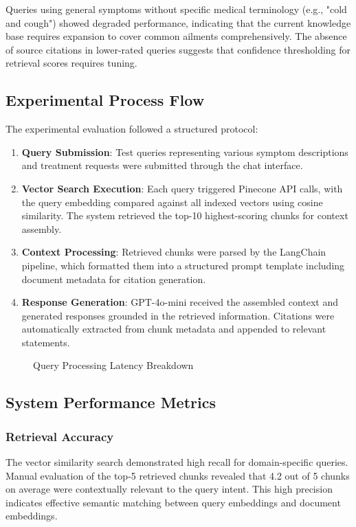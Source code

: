 \documentclass[conference]{IEEEtran}
\begin{document}
Queries using general symptoms without specific medical terminology (e.g., "cold and cough") showed degraded performance, indicating that the current knowledge base requires expansion to cover common ailments comprehensively. The absence of source citations in lower-rated queries suggests that confidence thresholding for retrieval scores requires tuning.

\subsection{Experimental Process Flow}
The experimental evaluation followed a structured protocol:

\begin{enumerate}
    \item \textbf{Query Submission}: Test queries representing various symptom descriptions and treatment requests were submitted through the chat interface.
    \item \textbf{Vector Search Execution}: Each query triggered Pinecone API calls, with the query embedding compared against all indexed vectors using cosine similarity. The system retrieved the top-10 highest-scoring chunks for context assembly.
    \item \textbf{Context Processing}: Retrieved chunks were parsed by the LangChain pipeline, which formatted them into a structured prompt template including document metadata for citation generation.
    \item \textbf{Response Generation}: GPT-4o-mini received the assembled context and generated responses grounded in the retrieved information. Citations were automatically extracted from chunk metadata and appended to relevant statements.
\end{enumerate}

\begin{figure}[htbp]
\centerline{}
\caption{Query Processing Latency Breakdown}
\label{fig:latency}
\end{figure}

\subsection{System Performance Metrics}

\subsubsection{Retrieval Accuracy}
The vector similarity search demonstrated high recall for domain-specific queries. Manual evaluation of the top-5 retrieved chunks revealed that 4.2 out of 5 chunks on average were contextually relevant to the query intent. This high precision indicates effective semantic matching between query embeddings and document embeddings.
\end{document}
